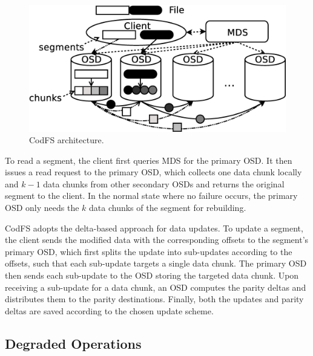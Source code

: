 \begin{figure}[t]
    \centering
    \includegraphics[width=0.9\linewidth]{figs/architecture}
    \vspace{-3pt}
    \caption{CodFS architecture.} %
    \label{fig:architecture}
\end{figure}

To read a segment, the client first queries MDS for the primary OSD.  It then
issues a read request to the primary OSD, which collects one data chunk
locally and $k-1$ data chunks from other secondary OSDs and returns the
original segment to the client. In the normal state where no failure occurs,
the primary OSD only needs the $k$ data chunks of the segment for rebuilding. 

CodFS adopts the delta-based approach for data updates.  
To update a segment, the client sends the modified data with the corresponding offsets
to the segment's primary OSD, which 
first splits the update into sub-updates according to the offsets, 
such that each sub-update targets a single data chunk. The primary OSD then 
sends each sub-update to the OSD storing the targeted data chunk.
Upon receiving a sub-update for a data chunk, an OSD computes the parity
deltas and distributes them to the parity destinations. Finally, both the updates and 
parity deltas are saved according to the chosen update scheme.

\subsection{Degraded Operations}

